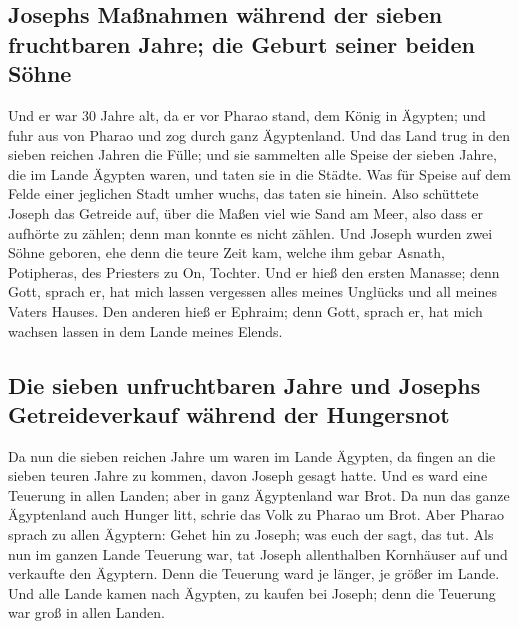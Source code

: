 \hypertarget{josephs-mauxdfnahmen-wuxe4hrend-der-sieben-fruchtbaren-jahre-die-geburt-seiner-beiden-suxf6hne}{%
\subsection{Josephs Maßnahmen während der sieben fruchtbaren Jahre; die
Geburt seiner beiden
Söhne}\label{josephs-mauxdfnahmen-wuxe4hrend-der-sieben-fruchtbaren-jahre-die-geburt-seiner-beiden-suxf6hne}}

 Und er war 30 Jahre alt, da er vor Pharao stand, dem
König in Ägypten; und fuhr aus von Pharao und zog durch ganz
Ägyptenland.  Und das Land trug in den sieben reichen
Jahren die Fülle;  und sie sammelten alle Speise der
sieben Jahre, die im Lande Ägypten waren, und taten sie in die Städte.
Was für Speise auf dem Felde einer jeglichen Stadt umher wuchs, das
taten sie hinein.  Also schüttete Joseph das Getreide
auf, über die Maßen viel wie Sand am Meer, also dass er aufhörte zu
zählen; denn man konnte es nicht zählen.  Und Joseph
wurden zwei Söhne geboren, ehe denn die teure Zeit kam, welche ihm gebar
Asnath, Potipheras, des Priesters zu On, Tochter.  Und er
hieß den ersten Manasse; denn Gott, sprach er, hat mich lassen vergessen
alles meines Unglücks und all meines Vaters Hauses.  Den
anderen hieß er Ephraim; denn Gott, sprach er, hat mich wachsen lassen
in dem Lande meines Elends.

\hypertarget{die-sieben-unfruchtbaren-jahre-und-josephs-getreideverkauf-wuxe4hrend-der-hungersnot}{%
\subsection{Die sieben unfruchtbaren Jahre und Josephs Getreideverkauf
während der
Hungersnot}\label{die-sieben-unfruchtbaren-jahre-und-josephs-getreideverkauf-wuxe4hrend-der-hungersnot}}

 Da nun die sieben reichen Jahre um waren im Lande
Ägypten,  da fingen an die sieben teuren Jahre zu kommen,
davon Joseph gesagt hatte. Und es ward eine Teuerung in allen Landen;
aber in ganz Ägyptenland war Brot.  Da nun das ganze
Ägyptenland auch Hunger litt, schrie das Volk zu Pharao um Brot. Aber
Pharao sprach zu allen Ägyptern: Gehet hin zu Joseph; was euch der sagt,
das tut.  Als nun im ganzen Lande Teuerung war, tat
Joseph allenthalben Kornhäuser auf und verkaufte den Ägyptern. Denn die
Teuerung ward je länger, je größer im Lande.  Und alle
Lande kamen nach Ägypten, zu kaufen bei Joseph; denn die Teuerung war
groß in allen Landen.

